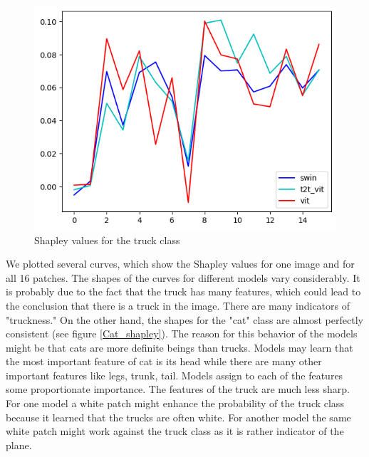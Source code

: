 \documentclass[magisterska,en]{pracamgr}
\begin{document}
\begin{figure}[H]
\centering
\includegraphics[scale=0.5]{./images/Truck_shapley.png}
\caption{Shapley values for the truck class}
\label{Truck_shapley}
\end{figure}

We plotted several curves, which show the Shapley values for one image and for all 16 patches. The shapes of the curves for different models vary considerably. It is probably due to the fact that the truck has many features, which could lead to the conclusion that there is a truck in the image. There are many indicators of "truckness." On the other hand, the shapes for the "cat" class are almost perfectly consistent (see figure \ref{Cat_shapley}). The reason for this behavior of the models might be that cats are more definite beings than trucks. Models may learn that the most important feature of cat is its head while there are many other important features like legs, trunk, tail. Models assign to each of the features some proportionate importance. The features of the truck are much less sharp. For one model a white patch might enhance the probability of the truck class because it learned that the trucks are often white. For another model the same white patch might work against the truck class as it is rather indicator of the plane.
\end{document}
